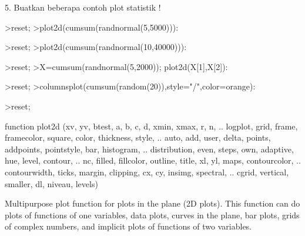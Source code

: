 \documentclass[a4paper,10pt]{article}
\begin{document}
\begin{eulernotebook}
\begin{eulercomment}
\begin{eulercomment}
\begin{eulercomment}
\begin{eulercomment}
\begin{eulercomment}
\begin{eulercomment}
\begin{eulercomment}
\begin{eulercomment}
\begin{eulercomment}
\begin{eulercomment}
\begin{euleroutput}
\end{euleroutput}
\begin{eulercomment}
5. Buatkan beberapa contoh plot statistik !
\end{eulercomment}
\begin{eulerprompt}
>reset;
>plot2d(cumsum(randnormal(5,5000))):
\end{eulerprompt}
\begin{eulerprompt}
>reset;
>plot2d(cumsum(randnormal(10,40000))):
\end{eulerprompt}
\begin{eulerprompt}
>reset;
>X=cumsum(randnormal(5,2000)); plot2d(X[1],X[2]):
\end{eulerprompt}
\begin{eulerprompt}
>reset;
>columnsplot(cumsum(random(20)),style="/",color=orange):
\end{eulerprompt}
\begin{eulerprompt}
>reset;
\end{eulerprompt}
\begin{eulercomment}
\end{eulercomment}
\begin{eulerttcomment}
  function plot2d (xv, yv, btest, a, b, c, d, xmin, xmax, r, n,  ..
  logplot, grid, frame, framecolor, square, color, thickness, style, ..
  auto, add, user, delta, points, addpoints, pointstyle, bar, histogram,  ..
  distribution, even, steps, own, adaptive, hue, level, contour,  ..
  nc, filled, fillcolor, outline, title, xl, yl, maps, contourcolor, ..
  contourwidth, ticks, margin, clipping, cx, cy, insimg, spectral,  ..
  cgrid, vertical, smaller, dl, niveau, levels)
\end{eulerttcomment}
\begin{eulercomment}
Multipurpose plot function for plots in the plane (2D plots). This function can do
plots of functions of one variables, data plots, curves in the plane, bar plots, grids
of complex numbers, and implicit plots of functions of two variables.


\end{eulercomment}
\end{eulercomment}
\end{eulercomment}
\end{eulercomment}
\end{eulercomment}
\end{eulercomment}
\end{eulercomment}
\end{eulercomment}
\end{eulercomment}
\end{eulercomment}
\end{eulercomment}
\end{eulernotebook}
\end{document}
